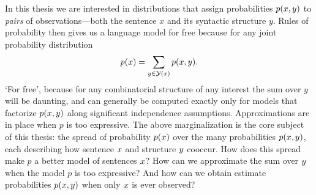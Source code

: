   In this thesis we are interested in distributions that assign probabilities $p(x, y)$ to \textit{pairs} of observations---both the sentence $x$ and its syntactic structure $y$. Rules of probability then gives us a language model for free because for any joint probability distribution
  \begin{align*}
    p(x) = \sum_{y \in \mathcal{Y}(x)} p(x, y).
  \end{align*}
  `For free', because for any combinatorial structure of any interest the sum over $y$ will be daunting, and can generally be computed exactly only for models that factorize $p(x, y)$ along significant independence assumptions. Approximations are  in place when $p$ is too expressive. The above marginalization is the core subject of this thesis: the spread of probability $p(x)$ over the many probabilities $p(x, y)$, each describing how sentence $x$ and structure $y$ cooccur. How does this spread make $p$ a better model of sentences $x$? How can we approximate the sum over $y$ when the model $p$ is too expressive? And how can we obtain estimate probabilities $p(x, y)$ when only $x$ is ever observed?




